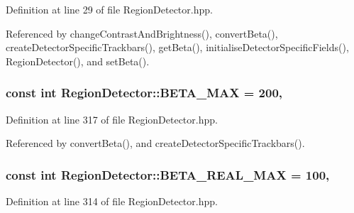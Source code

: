 Definition at line 29 of file Region\-Detector.\-hpp.



Referenced by change\-Contrast\-And\-Brightness(), convert\-Beta(), create\-Detector\-Specific\-Trackbars(), get\-Beta(), initialise\-Detector\-Specific\-Fields(), Region\-Detector(), and set\-Beta().

\hypertarget{classmultiscale_1_1analysis_1_1RegionDetector_ad2c6485f637cae5abee0303b41df1480}{
\subsubsection[{B\-E\-T\-A\-\_\-\-M\-A\-X}]{\setlength{\rightskip}{0pt plus 5cm}const int Region\-Detector\-::\-B\-E\-T\-A\-\_\-\-M\-A\-X = 200\hspace{0.3cm}{\ttfamily [static]}, {\ttfamily [private]}}}\label{classmultiscale_1_1analysis_1_1RegionDetector_ad2c6485f637cae5abee0303b41df1480}


Definition at line 317 of file Region\-Detector.\-hpp.



Referenced by convert\-Beta(), and create\-Detector\-Specific\-Trackbars().

\hypertarget{classmultiscale_1_1analysis_1_1RegionDetector_a19e9e6c3ea18fe9a3dbf7a1a02652985}{
\subsubsection[{B\-E\-T\-A\-\_\-\-R\-E\-A\-L\-\_\-\-M\-A\-X}]{\setlength{\rightskip}{0pt plus 5cm}const int Region\-Detector\-::\-B\-E\-T\-A\-\_\-\-R\-E\-A\-L\-\_\-\-M\-A\-X = 100\hspace{0.3cm}{\ttfamily [static]}, {\ttfamily [private]}}}\label{classmultiscale_1_1analysis_1_1RegionDetector_a19e9e6c3ea18fe9a3dbf7a1a02652985}


Definition at line 314 of file Region\-Detector.\-hpp.



